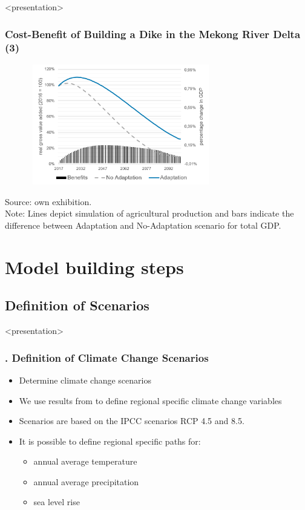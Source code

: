 \documentclass[11pt,aspectratio=169]{beamer}
\begin{document}
\begin{frame}<presentation>
	\frametitle{Cost-Benefit of Building a Dike in the Mekong River Delta (3)}
	\begin{figure}
	\includegraphics[width=8cm,height=5.25cm]{pictures/Cost_Benefit_Analysis_Dike}
	\end{figure}
	{\footnotesize Source: own exhibition.} \\
	{\footnotesize Note: Lines depict simulation of agricultural production and bars indicate the difference between Adaptation and No-Adaptation scenario for total GDP.}
	
\end{frame}



\section{Model building steps}

\subsection{Definition of Scenarios}

\begin{frame}<presentation>
	\frametitle{{\thesection.\thesubsection} Definition of Climate Change Scenarios}
	\begin{itemize}
		\item Determine climate change scenarios
		\item We use results from \cite{thuc2016climate} to define regional specific climate change variables
		\item Scenarios are based on the IPCC scenarios RCP 4.5 and 8.5.
		\item It is possible to define regional specific paths for:
			\begin{itemize}
				\item annual average temperature 
				\item annual average precipitation
				\item sea level rise
			\end{itemize}

	\end{itemize}
\end{frame}
\end{document}
